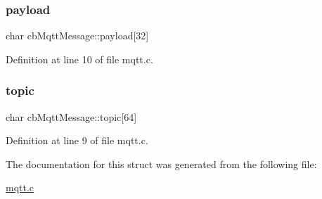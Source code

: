 \subsubsection{\texorpdfstring{payload}{payload}}
{\footnotesize\ttfamily char cb\+Mqtt\+Message\+::payload\mbox{[}32\mbox{]}}



Definition at line 10 of file mqtt.\+c.

\mbox{\label{structcbMqttMessage_aa40e9bbbebf6f869102542591b82f0a2}} 
\subsubsection{\texorpdfstring{topic}{topic}}
{\footnotesize\ttfamily char cb\+Mqtt\+Message\+::topic\mbox{[}64\mbox{]}}



Definition at line 9 of file mqtt.\+c.



The documentation for this struct was generated from the following file\+:\begin{DoxyCompactItemize}
\item 
\hyperlink{mqtt_8c}{mqtt.\+c}\end{DoxyCompactItemize}
